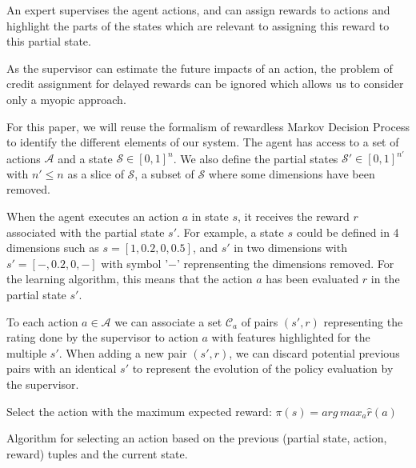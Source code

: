 \documentclass[letterpaper]{article} %
\begin{document}
An expert supervises the agent actions, and can assign rewards to actions and
highlight the parts of the states which are relevant to assigning this reward to
this partial state.

As the supervisor can estimate the future impacts of an action, the problem of
credit assignment for delayed rewards can be ignored which allows us to consider
only a myopic approach. 

For this paper, we will reuse the formalism of rewardless Markov Decision
Process to identify the different elements of our system. The agent has access
to a set of actions $\mathcal{A}$ and a state $\mathcal{S} \in [0,1]^{n}$. We
also define the partial states $\mathcal{S'} \in [0,1]^{n'}$ with $n' \leq n$ as
a slice of $\mathcal{S}$, a subset of $\mathcal{S}$ where some dimensions have
been removed. 

When the agent executes an action $a$ in state $s$, it receives the reward $r$
associated with the partial state $s'$. For example, a state $s$ could be
defined in 4 dimensions such as ${s=[1,0.2,0,0.5]}$, and $s'$ in two dimensions
with ${s'=[-,0.2,0,-]}$ with symbol '$-$' reprensenting the dimensions removed.
For the learning algorithm, this means that the action $a$ has been evaluated
$r$ in the partial state $s'$.  

To each action $a \in \mathcal{A}$ we can associate a set $\mathcal{C}_{a}$ of
pairs $(s',r)$ representing the rating done by the supervisor to action $a$ with
features highlighted for the multiple $s'$. When adding a new pair $(s',r)$, we
can discard potential previous pairs with an identical $s'$ to represent the
evolution of the policy evaluation by the supervisor.

\begin{algorithm}
    \DontPrintSemicolon
    Select the action with the maximum expected reward:
    $\pi(s) = arg\, max_{a} \hat{r}(a)$

    \caption{Algorithm for selecting an action based on the previous
    (partial state, action, reward) tuples and the current state.}
    \label{algo}
\end{algorithm}
\end{document}
